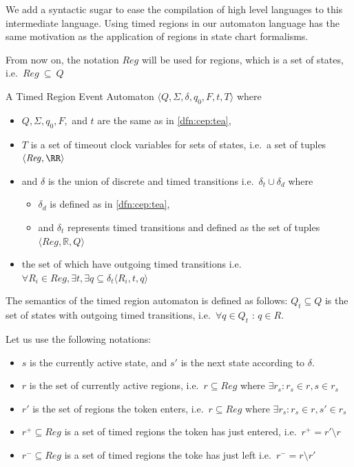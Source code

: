			We add a syntactic sugar to ease the compilation of high level languages to this intermediate language.
			Using timed regions in our automaton language has the same motivation as the application of regions in state chart formalisms.

			From now on, the notation $\mathit{Reg}$ will be used for regions, which is a set of states, i.e.~$\mathit{Reg}~\subseteq~Q$
		
		
			\begin{dfn}
				\label{dfn:cep:trea}
				A Timed Region Event Automaton $\langle Q,\Sigma,\delta,q_0, F, t, T \rangle$ where
				\begin{itemize}
					\item $Q, \Sigma, q_0, F,$ and  $t$ are the same as in \cref{dfn:cep:tea},
					\item $T$ is a set of timeout clock variables for sets of states, i.e.~a set of tuples $\langle \mathit{Reg}, \RR \rangle$
					\item and $\delta$ is the union of discrete and timed transitions i.e.~$\delta_t \cup \delta_d$ where
					\begin{itemize}
						\item $\delta_d$ is defined as in \cref{dfn:cep:tea},
						\item and $\delta_t$ represents timed transitions and defined as the set of tuples $\langle \mathit{Reg} , \mathbb{R} , Q \rangle$ 
					\end{itemize}
					\item  the set of which have outgoing timed transitions 
					i.e.~$ \forall R_i \in \mathit{Reg}, \exists t, \exists q  \subseteq \delta_t \langle R_i, t, q \rangle$ 
				\end{itemize}
			\end{dfn}
			
			The semantics of the timed region automaton is defined as follows:
			$Q_t \subseteq Q$ is the set of states with outgoing timed transitions, 
			i.e.~$\forall q \in Q_t$ : $ q \in R $. 
			
			
			Let us use the following notations: 

			\begin{itemize}
				\item $s$ is the currently active state, and $s'$ is the next state according to $\delta$.
		
				\item $r$ is the set of currently active regions, i.e.~$r \subseteq \mathit{Reg}$ where $\exists r_s : r_s \in r, s \in r_s $ 
			
				\item $r'$ is the set of regions the token enters, i.e.~$r \subseteq \mathit{Reg}$ where $\exists r_s :  r_s \in r, s' \in r_s $ 
			
				\item $r^+ \subseteq \mathit{Reg}$ is a set of timed regions the token has just entered, i.e.~$r^+ = r' \setminus r$ 
			
				\item $r^- \subseteq \mathit{Reg}$ is a set of timed regions the toke has just left i.e.~$r^- = r \setminus r'$
			\end{itemize}
		

